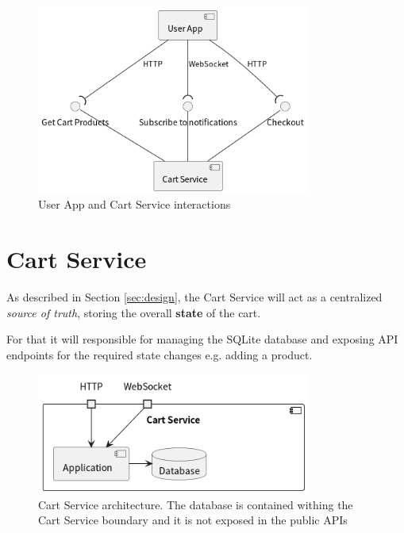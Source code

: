 \documentclass[openright]{normas-utf-tex} %
\begin{document}
\begin{figure}[H]
	\centering
	\includegraphics[width=0.8\textwidth]{./images/diagrams/UserApp.png}
	\caption[User App and Cart Service interactions]{User App and Cart Service interactions}
	\label{fig:dummy}
\end{figure}

\section{Cart Service}

As described in Section \ref{sec:design}, the Cart Service will act as a
centralized \textit{source of truth}, storing the overall \textbf{state} of the
cart.

For that it will responsible for managing the SQLite database and exposing API
endpoints for the required state changes e.g. adding a product.

\begin{figure}[H]
	\centering
	\includegraphics[width=0.8\textwidth]{./images/diagrams/CartService.png}
	\caption[Cart Service architecture]{Cart Service architecture. The database is contained withing the Cart Service boundary and it is not exposed in the public APIs}
	\label{fig:dummy}
\end{figure}
\end{document}
